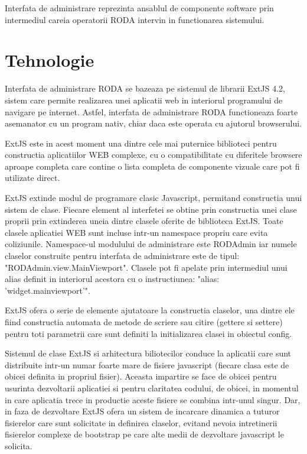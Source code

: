 Interfata de administrare reprezinta ansablul de componente software prin intermediul careia operatorii RODA intervin in functionarea sistemului. 

\section{Tehnologie}


Interfata de administrare RODA se bazeaza pe sistemul de librarii ExtJS 4.2, sistem care permite realizarea unei aplicatii web in interiorul programului de navigare pe internet. Astfel, interfata de administrare RODA functioneaza foarte asemanator cu un program nativ, chiar daca este operata cu ajutorul browserului. 

ExtJS este in acest moment una dintre cele mai puternice biblioteci pentru constructia aplicatiilor WEB complexe, cu o compatibilitate cu diferitele browsere aproape completa care contine o lista completa de componente vizuale care pot fi utilizate direct. 

ExtJS extinde modul de programare clasic Javascript, permitand constructia unui sistem de clase. Fiecare element al interfetei se obtine prin constructia unei clase proprii prin extinderea uneia dintre clasele oferite de biblioteca ExtJS. Toate clasele aplicatiei WEB sunt incluse intr-un namespace propriu care evita coliziunile. Namespace-ul modulului de administrare este RODAdmin iar numele claselor construite pentru interfata de administrare este de tipul: "RODAdmin.view.MainViewport". 
Clasele pot fi apelate prin intermediul unui alias definit in interiorul acestora cu o instructiunea: "alias: 'widget.mainviewport'". 

ExtJS ofera o serie de elemente ajutatoare la constructia claselor, una dintre ele fiind constructia automata de metode de scriere sau citire (gettere si settere) pentru toti parametrii care sunt definiti la initializarea clasei in obiectul config. 

Sistemul de clase ExtJS si arhitectura biliotecilor conduce la aplicatii care sunt distribuite intr-un numar foarte mare de fisiere javascript (fiecare clasa este de obicei definita in propriul fisier). Aceasta impartire se face de obicei pentru usurinta dezvoltarii aplicatiei si pentru claritatea codului, de obicei, in momentul in care aplicatia trece in productie aceste fisiere se combina intr-unul singur. Dar, in faza de dezvoltare ExtJS ofera un sistem de incarcare dinamica a tuturor fisierelor care sunt solicitate in definirea claselor, evitand nevoia intretinerii fisierelor complexe de bootstrap pe care alte medii de dezvoltare javascript le solicita. 

